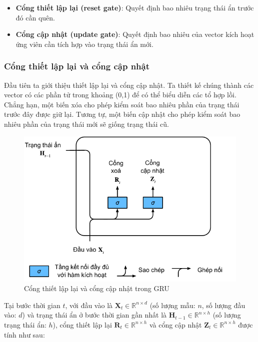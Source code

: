 \documentclass[conference]{IEEEtran}
\begin{document}
\begin{itemize}
    \item \textbf{Cổng thiết lập lại (reset gate)}: Quyết định bao nhiêu trạng thái ẩn trước đó cần quên.
    \item \textbf{Cổng cập nhật (update gate)}: Quyết định bao nhiêu của vector kích hoạt ứng viên cần tích hợp vào trạng thái ẩn mới.
\end{itemize}

\subsubsection{Cổng thiết lập lại và cổng cập nhật}
Đầu tiên ta giới thiệu thiết lập lại và cổng cập nhật. Ta thiết kế chúng thành các vector có các phần tử trong khoảng  (0,1)
để có thể biểu diễn các tổ hợp lồi. Chẳng hạn, một biến xóa cho phép kiểm soát bao nhiêu phần của trạng thái trước đây được giữ lại. Tương tự, một biến cập nhật cho phép kiểm soát bao nhiêu phần của trạng thái mới sẽ giống trạng thái cũ.


\begin{figure}[H]
    \centering
    \begin{minipage}{0.43\textwidth}
        \centering
        \includegraphics[width=1\textwidth]{bibliography/figure/GRU/gru_1.pdf}
        \caption{Cổng thiết lập lại và cổng cập nhật trong GRU}
        \label{fig:gru_del_up}
    \end{minipage}
\end{figure}


Tại bước thời gian $t$, với đầu vào là $\mathbf{X}_t \in \mathbb{R}^{n \times d}$ (số lượng mẫu: $n$, số lượng đầu vào: $d$) và trạng thái ẩn ở bước thời gian gần nhất là $\mathbf{H}_{t-1} \in \mathbb{R}^{n \times h}$ (số lượng trạng thái ẩn: $h$), cổng thiết lập lại $\mathbf{R}_t \in \mathbb{R}^{n \times h}$ và cổng cập nhật $\mathbf{Z}_t \in \mathbb{R}^{n \times h}$ được tính như sau:
\end{document}
